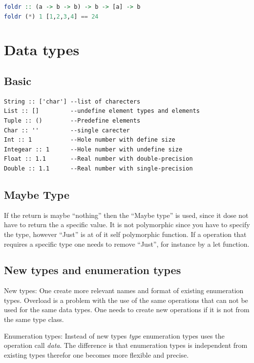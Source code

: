 \begin{lstlisting}[language=Haskell]
foldr :: (a -> b -> b) -> b -> [a] -> b
foldr (*) 1 [1,2,3,4] == 24
\end{lstlisting}


\newpage

\section{Data types}

\subsection{Basic}
\begin{verbatim}
String :: ['char'] --list of charecters
List :: []         --undefine element types and elements
Tuple :: ()        --Predefine elements
Char :: ''         --single carecter
Int :: 1           --Hole number with define size 
Integear :: 1      --Hole number with undefine size
Float :: 1.1       --Real number with double-precision  
Double :: 1.1      --Real number with single-precision 
\end{verbatim}


\subsection{Maybe Type}
If the return is maybe ``nothing'' then the ``Maybe type'' is used, since it dose not have to return
the a specific value. It is not polymorphic since you have to specify the type, however
``Just'' is at of it self polymorphic function. If a operation that requires a specific type one needs to
remove ``Just'', for instance by a let function.


\subsection{New types and enumeration types}
New types: One create more relevant names and format of existing enumeration types.
Overload is a problem with the use of the same operations that can not be used for the same data types.
One needs to create new operations if it is not from the same type class.

Enumeration types: Instead of new types \emph{type} enumeration types uses the operation call \emph{data}.
The difference is that enumeration types is independent from existing types therefor
one becomes more flexible and precise.

